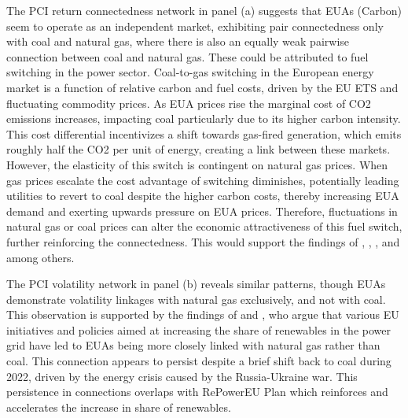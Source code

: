 \documentclass[preprint, 3p,
authoryear]{elsarticle} %
\begin{document}
The PCI return connectedness network in panel (a) suggests that EUAs
(Carbon) seem to operate as an independent market, exhibiting pair
connectedness only with coal and natural gas, where there is also an
equally weak pairwise connection between coal and natural gas. These
could be attributed to fuel switching in the power sector. Coal-to-gas
switching in the European energy market is a function of relative carbon
and fuel costs, driven by the EU ETS and fluctuating commodity prices.
As EUA prices rise the marginal cost of CO2 emissions increases,
impacting coal particularly due to its higher carbon intensity. This
cost differential incentivizes a shift towards gas-fired generation,
which emits roughly half the CO2 per unit of energy, creating a link
between these markets. However, the elasticity of this switch is
contingent on natural gas prices. When gas prices escalate the cost
advantage of switching diminishes, potentially leading utilities to
revert to coal despite the higher carbon costs, thereby increasing EUA
demand and exerting upwards pressure on EUA prices. Therefore,
fluctuations in natural gas or coal prices can alter the economic
attractiveness of this fuel switch, further reinforcing the
connectedness. This would support the findings of
\citet{bertrand_carbon_2014}, \citet{hintermann_allowance_2010},
\citet{creti_carbon_2012}, and \citet{pettersson_fuel_2012} among
others.

The PCI volatility network in panel (b) reveals similar patterns, though
EUAs demonstrate volatility linkages with natural gas exclusively, and
not with coal. This observation is supported by the findings of
\citet{falbo_renewables_2019} and \citet{bertrand_carbon_2014}, who
argue that various EU initiatives and policies aimed at increasing the
share of renewables in the power grid have led to EUAs being more
closely linked with natural gas rather than coal. This connection
appears to persist despite a brief shift back to coal during 2022,
driven by the energy crisis caused by the Russia-Ukraine war. This
persistence in connections overlaps with RePowerEU Plan which reinforces
and accelerates the increase in share of renewables.
\end{document}

